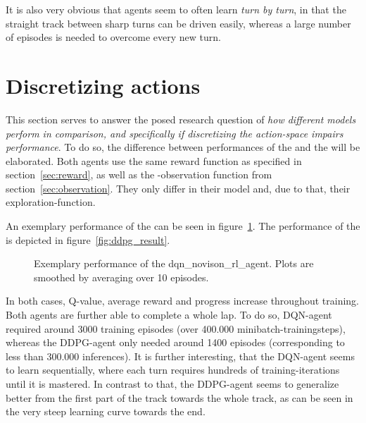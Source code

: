 It is also very obvious that agents seem to often learn \textit{turn by turn}, in that the straight track between sharp turns can be driven easily, whereas a large number of episodes is needed to overcome every new turn.

\section{Discretizing actions}

This section serves to answer the posed research question of \textit{how different models perform in comparison, and specifically if discretizing the action-space impairs performance}. To do so, the difference between performances of the  and the  will be elaborated.
Both agents use the same reward function as specified in section~\ref{sec:reward}, as well as the -observation function from section~\ref{sec:observation}. They only differ in their model and, due to that, their exploration-function.

An exemplary performance of the  can be seen in figure~\ref{fig:dqn_result}. The performance of the  is depicted in figure~\ref{fig:ddpg_result}.

\begin{figure}[h!]
	{%
		\setlength{\fboxsep}{0pt}%
		\setlength{\fboxrule}{1pt}%
	}%
	\centering
	\caption[Exemplary performance of the dqn\_novison\_rl\_agent]{Exemplary performance of the dqn\_novison\_rl\_agent. Plots are smoothed by averaging over 10 episodes.}
	\label{fig:dqn_result}
\end{figure}


In both cases, Q-value, average reward and progress increase throughout training. Both agents are further able to complete a whole lap. To do so, DQN-agent required around 3000 training episodes (over 400.000 minibatch-trainingsteps), whereas the DDPG-agent only needed around 1400 episodes (corresponding to less than 300.000 inferences). It is further interesting, that the DQN-agent seems to learn sequentially, where each turn requires hundreds of training-iterations until it is mastered. In contrast to that, the DDPG-agent seems to generalize better from the first part of the track towards the whole track, as can be seen in the very steep learning curve towards the end.


